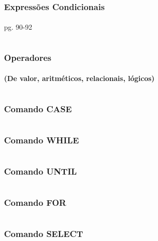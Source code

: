 \documentclass[aspectratio=1610]{beamer}
\begin{document}
\begin{frame}
  \frametitle{Expressões Condicionais}
  \framesubtitle{}
      pg. 90-92
\end{frame}


\section [Operadores]{}
\begin{frame}
  \frametitle{Operadores }
  \framesubtitle{(De valor, aritméticos, relacionais, lógicos)}

\end{frame}


\section [CASE]{}
\begin{frame}
  \frametitle{Comando CASE}
  \framesubtitle{}

	\begin{block}{}
			
	\end{block}

\end{frame}


\section [WHILE]{}
\begin{frame}
  \frametitle{Comando WHILE}
  \framesubtitle{}

\end{frame}


\section [UNTIL]{}
\begin{frame}
  \frametitle{Comando UNTIL}
  \framesubtitle{}

\end{frame}


\section [FOR]{}
\begin{frame}
  \frametitle{Comando FOR}
  \framesubtitle{}

\end{frame}


\section [SELECT]{}
\begin{frame}
  \frametitle{Comando SELECT}
  \framesubtitle{}

\end{frame}
\end{document}
